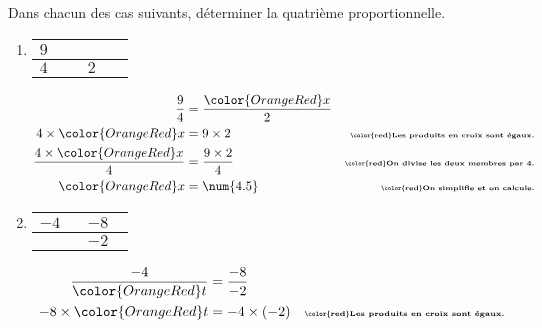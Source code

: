 \begin{corrige}
    Dans chacun des cas suivants, déterminer la quatrième proportionnelle.\par\smallskip
    \begin{enumerate}
        \item {\renewcommand{\arraystretch}{1.2}
            \begin{tabular}{|>{\centering\arraybackslash}m{0.1\linewidth}|>{\centering\arraybackslash}m{0.1\linewidth}|}
                \hline
                $9$&{\bfseries\color{OrangeRed}$x$ ?}\\\hline
                $4$&$2$\\\hline
            \end{tabular}
        }\smallskip
        \begin{align*}
            \dfrac{9}{4}                              &=\dfrac{\color{OrangeRed} x}{2}&\\
            4\times {\color{OrangeRed} x}             &= 9\times 2                    &\text{\tiny\bfseries\color{red}Les produits en croix sont égaux.}\\
            \dfrac{4\times {\color{OrangeRed} x}}{4}  &= \dfrac{9\times 2}{4}         &\text{\tiny\bfseries\color{red}On divise les deux membres par 4.}\\
            {\color{OrangeRed} x}                     &=\num{4.5}                     &\text{\tiny\bfseries\color{red}On simplifie et on calcule.}
        \end{align*}        
        \item {\renewcommand{\arraystretch}{1.2}
            \begin{tabular}{|>{\centering\arraybackslash}m{0.1\linewidth}|>{\centering\arraybackslash}m{0.1\linewidth}|}
                \hline
                $-4$&$-8$\\\hline
                {\bfseries\color{OrangeRed}$t$ ?}&$-2$\\\hline            
            \end{tabular}
        }\smallskip
        \begin{align*}
            \dfrac{-4}{\color{OrangeRed} t}                              &=\dfrac{-8}{-2}&\\
            -8\times {\color{OrangeRed} t}             &= -4\times (-2)                    &\text{\tiny\bfseries\color{red}Les produits en croix sont égaux.}\\

\end{align*}
\end{enumerate}
\end{corrige}
